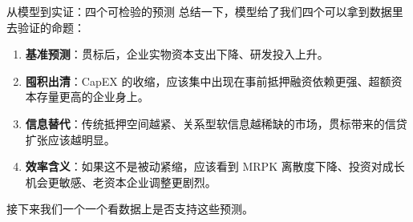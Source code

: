 \begin{frame}{从模型到实证：四个可检验的预测}
  总结一下，模型给了我们四个可以拿到数据里去验证的命题：

  \begin{enumerate}
    \item \textbf{基准预测}：贯标后，企业实物资本支出下降、研发投入上升。
    \item \textbf{囤积出清}：CapEX 的收缩，应该集中出现在事前抵押融资依赖更强、超额资本存量更高的企业身上。
    \item \textbf{信息替代}：传统抵押空间越紧、关系型软信息越稀缺的市场，贯标带来的信贷扩张应该越明显。
    \item \textbf{效率含义}：如果这不是被动紧缩，应该看到 MRPK 离散度下降、投资对成长机会更敏感、老资本企业调整更剧烈。
  \end{enumerate}

  \vspace{0.4em}
  接下来我们一个一个看数据上是否支持这些预测。
\end{frame}

